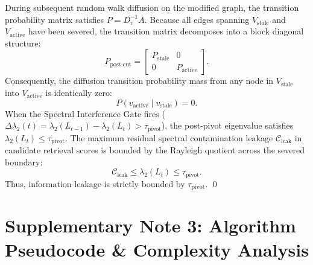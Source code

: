 \documentclass[11pt]{article}
\begin{document}
During subsequent random walk diffusion on the modified graph, the transition probability matrix satisfies $P = D_v^{-1} A$. Because all edges spanning $V_{\text{stale}}$ and $V_{\text{active}}$ have been severed, the transition matrix decomposes into a block diagonal structure:
\begin{equation}
  P_{\text{post-cut}} = \begin{bmatrix} P_{\text{stale}} & 0 \\ 0 & P_{\text{active}} \end{bmatrix}.
\end{equation}
Consequently, the diffusion transition probability mass from any node in $V_{\text{stale}}$ into $V_{\text{active}}$ is identically zero:
\begin{equation}
  P(v_{\text{active}} \mid v_{\text{stale}}) = 0.
\end{equation}
When the Spectral Interference Gate fires ($\Delta \lambda_2(t) = \lambda_2(L_{t-1}) - \lambda_2(L_t) > \tau_{\text{pivot}}$), the post-pivot eigenvalue satisfies $\lambda_2(L_t) \le \tau_{\text{pivot}}$. The maximum residual spectral contamination leakage $\mathcal{C}_{\text{leak}}$ in candidate retrieval scores is bounded by the Rayleigh quotient across the severed boundary:
\begin{equation}
  \mathcal{C}_{\text{leak}} \le \lambda_2(L_t) \le \tau_{\text{pivot}}.
\end{equation}
Thus, information leakage is strictly bounded by $\tau_{\text{pivot}}$. \qed

\newpage

\section{Supplementary Note 3: Algorithm Pseudocode \& Complexity Analysis}
\end{document}
